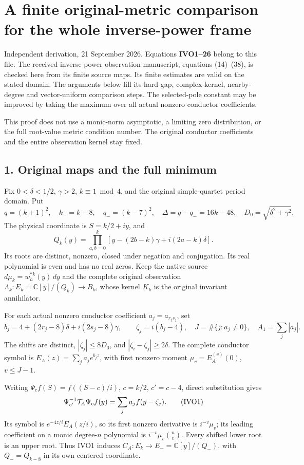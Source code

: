 \section{A finite original-metric comparison for the whole inverse-power frame}\label{a-finite-original-metric-comparison-for-the-whole-inverse-power-frame}

Independent derivation, 21 September 2026. Equations \textbf{IVO1--26} belong to this file. The received inverse-power observation manuscript, equations (14)--(38), is checked here from its finite source maps. Its finite estimates are valid on the stated domain. The arguments below fill its hard-gap, complex-kernel, nearby-degree and vector-uniform comparison steps. The selected-pole constant may be improved by taking the maximum over all actual nonzero conductor coefficients.

This proof does not use a monic-norm asymptotic, a limiting zero distribution, or the full root-value metric condition number. The original conductor coefficients and the entire observation kernel stay fixed.

\subsection{1. Original maps and the full minimum}\label{original-maps-and-the-full-minimum}

Fix \(0<\delta<1/2\), \(\gamma>2\), \(k\equiv1\bmod4\), and the original simple-quartet period domain. Put \[
q=(k+1)^2,\quad k_-=k-8,\quad q_-=(k-7)^2,\quad
\Delta=q-q_-=16k-48,\quad D_0=\sqrt{\delta^2+\gamma^2}.
\] The physical coordinate is \(S=k/2+iy\), and \[
Q_k(y)=\prod_{a,b=0}^k[y-(2b-k)\gamma+i(2a-k)\delta].
\] Its roots are distinct, nonzero, closed under negation and conjugation. Its real polynomial is even and has no real zeros. Keep the native source \(d\mu_k=w_h^{*k}(y)\,dy\) and the complete original observation \(\Lambda_k:E_k=\mathbb C[y]/(Q_k)\to B_k\), whose kernel \(K_k\) is the original invariant annihilator.

For each actual nonzero conductor coefficient \(a_j=a_{r_js_j}\), set \[
b_j=4+(2r_j-8)\delta+i(2s_j-8)\gamma,\qquad
\zeta_j=i(b_j-4),\quad J=\#\{j:a_j\ne0\},\quad A_1=\sum_j|a_j|.
\] The shifts are distinct, \(|\zeta_j|\le8D_0\), and \(|\zeta_i-\zeta_j|\ge2\delta\). The complete conductor symbol is \(E_A(z)=\sum_ja_je^{b_jz}\), with first nonzero moment \(\mu_v=E_A^{(v)}(0)\), \(v\le J-1\).

Writing \(\Psi_cf(S)=f((S-c)/i)\), \(c=k/2\), \(c'=c-4\), direct substitution gives \[
\Psi_{c'}^{-1}{\cal T}_A\Psi_cf(y)=\sum_ja_jf(y-\zeta_j).
\tag{IVO1}
\] Its symbol is \(e^{-4z/i}E_A(z/i)\), so its first nonzero derivative is \(i^{-v}\mu_v\); its leading coefficient on a monic degree-\(n\) polynomial is \(i^{-v}\mu_v\binom nv\). Every shifted lower root is an upper root. Thus IVO1 induces \(C_A:E_k\to E_-=\mathbb C[y]/(Q_-)\), with \(Q_-=Q_{k-8}\) in its own centered coordinate.

